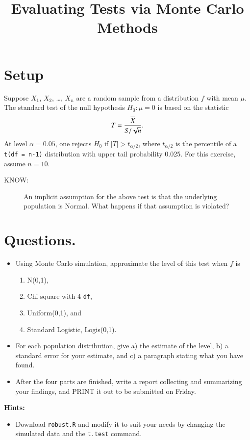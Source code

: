 \documentclass[11pt,english]{article}
\title{Evaluating Tests via Monte Carlo Methods}
\author{}
\date{}
\begin{document}
\maketitle


\section*{Setup}
\label{sec-1}


Suppose $X_{1}$, $X_{2}$, \ldots{}, $X_{n}$ are a random sample from a distribution $f$ with mean $\mu$.  The standard test of the null hypothesis $H_{0}: \mu = 0$ is based on the statistic
\[
T = \frac{\overline{X}}{S/\sqrt{n}}.
\]
At level $\alpha = 0.05$, one rejects $H_{0}$ if $|T| > t_{\alpha/2}$, where $t_{\alpha/2}$ is the percentile of a \texttt{t(df = n-1)} distribution with upper tail probability 0.025.  For this exercise, assume $n = 10$.


\begin{description}
\item[KNOW:] An implicit assumption for the above test is that the underlying population is Normal. What happens if that assumption is violated?
\end{description}
\section*{Questions.}
\label{sec-2}


\begin{itemize}
\item Using Monte Carlo simulation, approximate the level of this test when $f$ is
\begin{enumerate}
\item N(0,1),
\item Chi-square with 4 \texttt{df},
\item Uniform(0,1), and
\item Standard Logistic, Logis(0,1).
\end{enumerate}
\item For each population distribution, give a) the estimate of the level, b) a standard error for your estimate, and c) a paragraph stating what you have found.
\item After the four parts are finished, write a report collecting and summarizing your findings, and PRINT it out to be submitted on Friday.
\end{itemize}

\textbf{Hints:}

\begin{itemize}
\item Download \texttt{robust.R} and modify it to suit your needs by changing the simulated data and the \texttt{t.test} command.
\end{itemize}
\end{document}
